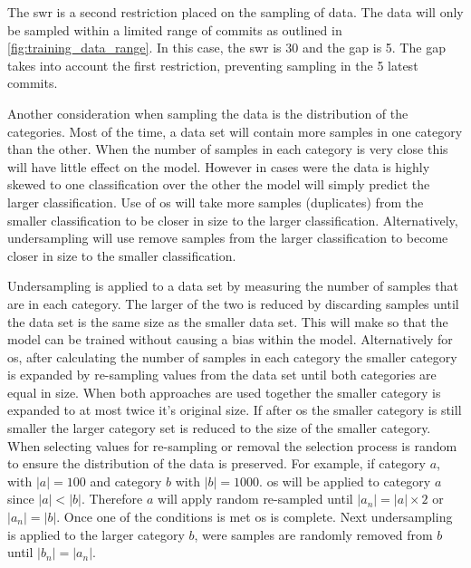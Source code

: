The \gls{swr} is a second restriction placed on the sampling of data. The data will only be sampled within a limited range of commits as outlined in \autoref{fig:training_data_range}. In this case, the \gls{swr} is 30 and the gap is 5. The gap takes into account the first restriction, preventing sampling in the 5 latest commits.

Another consideration when sampling the data is the distribution of the categories. Most of the time, a data set will contain more samples in one category than the other. When the number of samples in each category is very close this will have little effect on the model. However in cases were the data is highly skewed to one classification over the other the model will simply predict the larger classification. Use of \gls{os} will take more samples (duplicates) from the smaller classification to be closer in size to the larger classification. Alternatively, undersampling will use remove samples from the larger classification to become closer in size to the smaller classification.

Undersampling is applied to a data set by measuring the number of samples that are in each category. The larger of the two is reduced by discarding samples until the data set is the same size as the smaller data set. This will make so that the model can be trained without causing a bias within the model. Alternatively for \gls{os}, after calculating the number of samples in each category the smaller category is expanded by re-sampling values from the data set until both categories are equal in size. When both approaches are used together the smaller category is expanded to at most twice it's original size. If after \gls{os} the smaller category is still smaller the larger category set is reduced to the size of the smaller category. When selecting values for re-sampling or removal the selection process is random to ensure the distribution of the data is preserved. For example, if category $a$, with $|a| = 100$ and category $b$ with $|b| = 1000$. \gls{os} will be applied to category $a$ since $|a| < |b|$. Therefore $a$ will apply random re-sampled until $|a_n| = |a| \times 2$ or $|a_n| = |b|$. Once one of the conditions is met \gls{os} is complete. Next undersampling is applied to the larger category $b$, were samples are randomly removed from $b$ until $|b_n| = |a_n|$.

